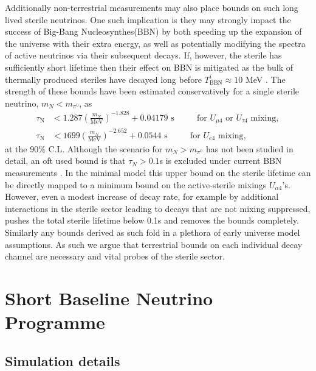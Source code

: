 \documentclass[11pt, a4paper]{article}
\begin{document}
Additionally non-terrestrial measurements may also place bounds on such long lived sterile neutrinos. One such implication is they may strongly impact the success of Big-Bang Nucleosynthes(BBN) by both speeding up the expansion of the universe with their extra energy, as well as potentially modifying the spectra of active neutrinos via their subsequent decays. If, however, the sterile has sufficiently short lifetime  then their effect on BBN is mitigated as the bulk of thermally produced steriles have decayed long before $T^i_\text{BBN} \approx 10$ MeV \cite{Fields:2006ga}. The strength of these bounds have been estimated conservatively for a single sterile neutrino, $m_N < m_{\pi^0}$, as \cite{Dolgov:2000jw,Dolgov:2000pj}
\begin{align*}
	\tau_\text{N} &< 1.287 \left( \frac{m_N}{\text{MeV}}\right)^{-1.828}+0.04179 \text{  s    $\qquad$  for $U_{\mu 4}$ or $U_{\tau 4}$ mixing},\\
	\tau_\text{N} &< 1699 \left( \frac{m_N}{\text{MeV}}\right)^{-2.652}+0.0544 \text{  s    $\qquad$  for $U_{e 4}$ mixing},
\end{align*}
at the 90\% C.L. Although the scenario for $m_N > m_{\pi^0}$ has not been studied in detail, an oft used bound is that $\tau_N > 0.1$s is excluded under current BBN measurements \cite{Dolgov:2000j}. In the minimal model this upper bound on the sterile lifetime can be directly mapped to a minimum bound on the active-sterile mixings $U_{\alpha 4}$'s. However, even a modest increase of decay rate, for example by additional interactions in the sterile sector leading to decays that are not mixing suppressed, pushes the total sterile lifetime below 0.1s and removes the bounds completely. Similarly any bounds derived as such fold in a plethora of early universe model assumptions. As such we argue that terrestrial bounds on each individual decay channel are necessary and vital probes of the sterile sector. \\

\section{\label{sec:simulation}Short Baseline Neutrino Programme}

\subsection{Simulation details}
\end{document}

